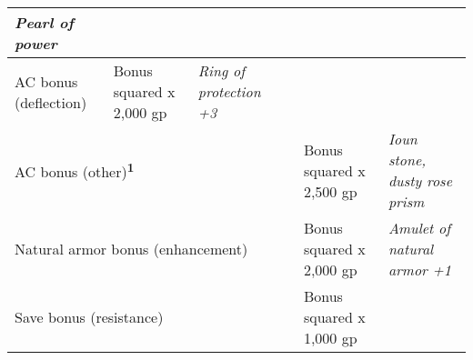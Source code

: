\begin{longtable}{llllll}
{\begin{minipage}[t]{0.042in}
\textit{Pearl of power}\end{minipage}}\\
\hline
\multicolumn{1}{p{0.042in}|}{\begin{minipage}[t]{0.042in}\raggedright
AC bonus (deflection) \end{minipage}} & \multicolumn{1}{|p{1.506in}|}{\begin{minipage}[t]{1.506in}\raggedright
Bonus squared  x 2,000 gp \end{minipage}} & \multicolumn{1}{p{1.628in}|}{\begin{minipage}[t]{1.628in}\raggedright
\textit{Ring of protection +3}\end{minipage}}\\
\hline
\multicolumn{4}{p{1.366in}|}{\begin{minipage}[t]{1.366in}\raggedright
AC bonus (other)\textsuperscript{\textbf{1}}\textbf{ }\end{minipage}} & \multicolumn{1}{|p{1.506in}|}{\begin{minipage}[t]{1.506in}\raggedright
Bonus squared  x 2,500 gp \end{minipage}} & \multicolumn{1}{p{1.628in}|}{\begin{minipage}[t]{1.628in}\raggedright
\textit{Ioun stone, dusty rose prism}\end{minipage}}\\
\hline
\multicolumn{4}{p{1.366in}|}{\begin{minipage}[t]{1.366in}\raggedright
Natural armor bonus (enhancement) \end{minipage}} & \multicolumn{1}{|p{1.506in}|}{\begin{minipage}[t]{1.506in}\raggedright
Bonus squared  x 2,000 gp \end{minipage}} & \multicolumn{1}{p{1.628in}|}{\begin{minipage}[t]{1.628in}\raggedright
\textit{Amulet of natural armor +1}\end{minipage}}\\
\hline
\multicolumn{4}{p{1.366in}|}{\begin{minipage}[t]{1.366in}\raggedright
Save bonus (resistance) \end{minipage}} & \multicolumn{1}{|p{1.506in}|}{\begin{minipage}[t]{1.506in}\raggedright
Bonus squared  x 1,000 gp \end{minipage}} & \multicolumn{1}{p{1.628in}|}{\begin{minipage}[t]{1.628in}\raggedright

\end{minipage}}
\end{longtable}
